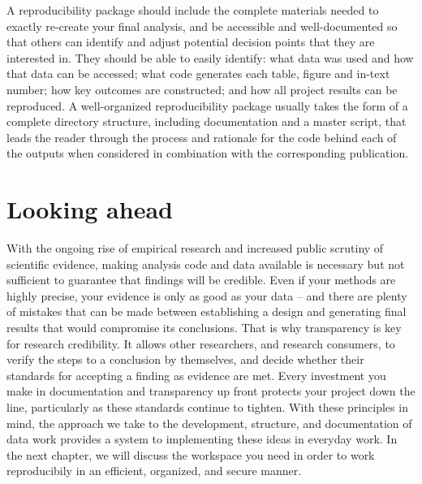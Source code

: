 A reproducibility package should include the complete materials needed
to exactly re-create your final analysis,
and be accessible and well-documented so that others can identify
and adjust potential decision points that they are interested in.
They should be able to easily identify:
what data was used and how that data can be accessed;
what code generates each table, figure and in-text number;
how key outcomes are constructed;
and how all project results can be reproduced.
A well-organized reproducibility package usually takes the form
of a complete directory structure, including documentation and a master script,
that leads the reader through the process and rationale
for the code behind each of the outputs
when considered in combination with the corresponding publication.

\section{Looking ahead}
With the ongoing rise of empirical research and increased public scrutiny of scientific evidence,
making analysis code and data available
is necessary but not sufficient to guarantee that findings will be credible.
Even if your methods are highly precise,
your evidence is only as good as your data --
and there are plenty of mistakes that can be made between
establishing a design and generating final results that would compromise its conclusions.
That is why transparency is key for research credibility.
It allows other researchers, and research consumers,
to verify the steps to a conclusion by themselves,
and decide whether their standards for accepting a finding as evidence are met.
Every investment you make in documentation and transparency up front
protects your project down the line, particularly as these standards continue to tighten.
With these principles in mind,
the approach we take to the development, structure,
and documentation of data work
provides a system to implementing these ideas in everyday work.
In the next chapter, we will discuss the workspace you need
in order to work reproducibily in an efficient, organized, and secure manner.
